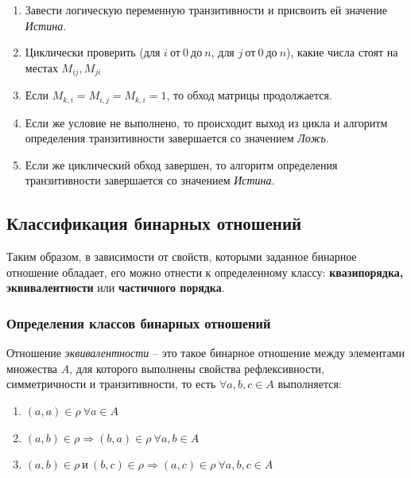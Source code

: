 \documentclass[bachelor, och, labwork]{shiza}
\begin{document}
\begin{enumerate}
    
    \item Завести логическую переменную транзитивности и присвоить ей значение \textit{Истина}.

    \item Циклически проверить (для $i ~\text{от}~ 0 ~\text{до}~ n$, 
    для $j ~\text{от}~ 0 ~\text{до}~ n$), какие числа стоят на местах $M_{ij},M_{ji}$
    
    \item Если $M_{k,i}=M_{i,j}=M_{k,i}=1$, то обход матрицы продолжается.
   
    \item Если же условие не выполнено, то происходит выход из цикла и алгоритм 
    определения транзитивности завершается со значением \textit{Ложь}.

    \item Если же циклический обход завершен, то алгоритм определения 
    транзитивности завершается со значением \textit{Истина}.

\end{enumerate}

\subsection{Классификация бинарных отношений}

Таким образом, в зависимости от свойств, которыми заданное бинарное отношение
обладает, его можно отнести к определенному классу: \textbf{квазипорядка,
эквивалентности} или \textbf{частичного порядка}. 

\subsubsection{Определения классов бинарных отношений}

Отношение \textit{эквивалентности} -- это такое бинарное отношение между элементами
множества $A$, для которого выполнены свойства рефлексивности, симметричности 
и транзитивности, то есть $\forall a,b,c \in A$ выполняется:
\begin{enumerate}
    \item $(a,a)\in\rho~\forall a \in A$
    \item $(a,b)\in\rho\Rightarrow (b,a)\in\rho~\forall a,b\in A$
    \item $(a,b)\in\rho ~\text{и}~ (b,c)\in\rho\Rightarrow (a,c) \in\rho ~\forall a,b,c \in A $
\end{enumerate}
\end{document}
